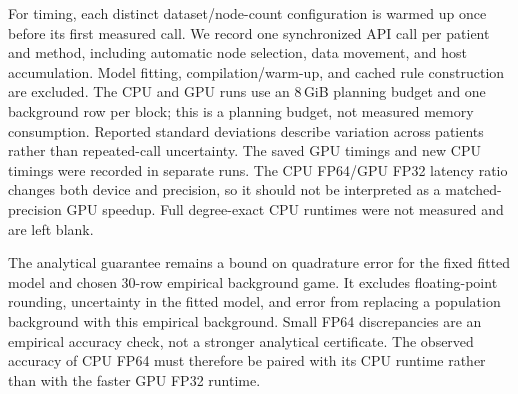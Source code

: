 For timing, each distinct dataset/node-count configuration is warmed up
once before its first measured call. We record one synchronized API call
per patient and method, including automatic node selection, data movement,
and host accumulation. Model fitting, compilation/warm-up, and cached rule
construction are excluded. The CPU and GPU runs use an 8\,GiB planning
budget and one background row per block; this is a planning budget, not
measured memory consumption. Reported standard deviations describe
variation across patients rather than repeated-call uncertainty.
The saved GPU timings and new CPU timings were recorded in separate runs.
The CPU FP64/GPU FP32 latency ratio changes both device and precision,
so it should not be interpreted as a matched-precision GPU speedup.
Full degree-exact CPU runtimes were not measured and are left blank.

The analytical guarantee remains a bound on quadrature error for the
fixed fitted model and chosen 30-row empirical background game.
It excludes floating-point rounding, uncertainty in the fitted model,
and error from replacing a population background with this empirical
background. Small FP64 discrepancies are an empirical accuracy check,
not a stronger analytical certificate. The observed accuracy of CPU FP64
must therefore be paired with its CPU runtime rather than with the faster
GPU FP32 runtime.
